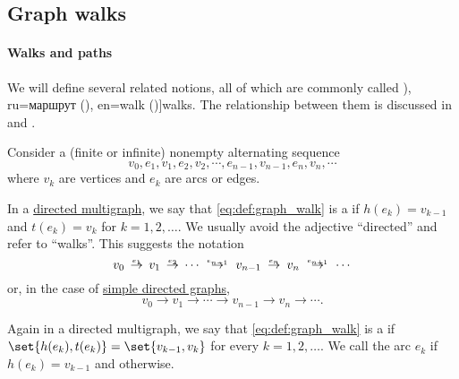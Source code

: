 \subsection{Graph walks}\label{subsec:graph_walks}

\paragraph{Walks and paths}

\begin{definition}\label{def:graph_walk}\mimprovised
  We will define several related notions, all of which are commonly called \term[bg=маршрут (\cite[11]{Мирчев2001}), ru=маршрут (\cite[23]{Емеличев1990}), en=walk (\cite[10]{Diestel2005})]{walks}. The relationship between them is discussed in  and .

  Consider a (finite or infinite) nonempty alternating sequence
  \begin{equation}\label{eq:def:graph_walk}
    v_0, e_1, v_1, e_2, v_2, \cdots, e_{n-1}, v_{n-1}, e_n, v_n, \cdots
  \end{equation}
  where \( v_k \) are vertices and \( e_k \) are arcs or edges.

  \begin{thmenum}[series=def:graph_walk]
     In a \hyperref[def:directed_multigraph]{directed multigraph}, we say that \eqref{eq:def:graph_walk} is a  if \( h(e_k) = v_{k-1} \) and \( t(e_k) = v_k \) for \( k = 1, 2, \ldots \). We usually avoid the adjective \enquote{directed} and refer to \enquote{walks}. This suggests the notation
    \begin{equation}\label{eq:def:graph_walk/directed}
      v_0 \reloset {e_1} \to v_1 \reloset {e_2} \to \cdots \reloset {e_{n-1}} \to v_{n-1} \reloset {e_n} \to v_n \reloset {e_{n+1}} \to \cdots
    \end{equation}
    or, in the case of \hyperref[def:directed_graph]{simple directed graphs},
    \begin{equation*}
      v_0 \to v_1 \to \cdots \to v_{n-1} \to v_n \to \cdots.
    \end{equation*}

     Again in a directed multigraph, we say that \eqref{eq:def:graph_walk} is a  if \( \set{ h(e_k), t(e_k) } = \set{ v_{k-1}, v_k } \) for every \( k = 1, 2, \ldots \). We call the arc \( e_k \)  if \( h(e_k) = v_{k-1} \) and  otherwise.


\end{thmenum}
\end{definition}
